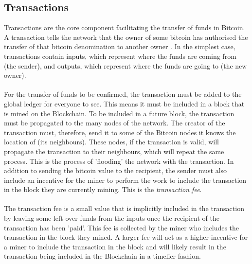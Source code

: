 \subsection{Transactions}\label{background-transactions}
Transactions are the core component facilitating the transfer of funds in Bitcoin. A transaction tells the network that the owner of some bitcoin has authorised the transfer of that bitcoin denomination to another owner \cite{RefWorks:doc:5c39e80ae4b0854ae611b047}. In the simplest case, transactions contain inputs, which represent where the funds are coming from (the sender), and outputs, which represent where the funds are going to (the new owner). 
\\\\
For the transfer of funds to be confirmed, the transaction must be added to the global ledger for everyone to see. This means it must be included in a block that is mined on the Blockchain. To be included in a future block, the transaction must be propagated to the many nodes of the network. The creator of the transaction must, therefore, send it to some of the Bitcoin nodes it knows the location of (its neighbours). These nodes, if the transaction is valid, will propagate the transaction to their neighbours, which will repeat the same process. This is the process of 'flooding' the network with the transaction. In addition to sending the bitcoin value to the recipient, the sender must also include an incentive for the miner to perform the work to include the transaction in the block they are currently mining. This is the \textit{transaction fee}.
\\\\
The transaction fee is a small value that is implicitly included in the transaction by leaving some left-over funds from the inputs once the recipient of the transaction has been 'paid'. This fee is collected by the miner who includes the transaction in the block they mined. A larger fee will act as a higher incentive for a miner to include the transaction in the block and will likely result in the transaction being included in the Blockchain in a timelier fashion.  

